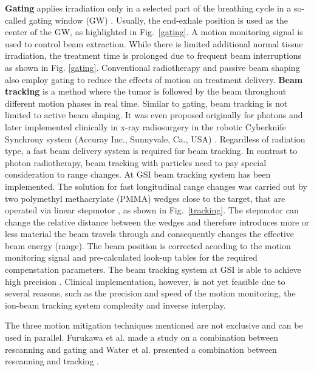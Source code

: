 \documentclass[type=dr, dr=rernat, accentcolor=tud7b,colorbacktitle, bigchapter, openright, twoside, 12pt ]{tudthesis}
\begin{document}
\textbf{Gating} applies irradiation only in a selected part of the breathing cycle in a so-called gating window (GW) \cite{Minohara2000,Lu2006}. Usually, the end-exhale position is used as the center of the GW, as highlighted in Fig.~\ref{gating}.
A motion monitoring signal is used to control beam extraction. While there is limited additional normal tissue irradiation, the treatment time is prolonged due to frequent beam interruptions as shown in Fig. \ref{gating}.
Conventional radiotherapy and passive beam shaping also employ gating to reduce the effects of motion on treatment delivery.
\newline
\textbf{Beam tracking} is a method where the tumor is followed by the beam throughout different motion phases in real time. Similar to gating, beam tracking is not limited to active beam shaping. It was even proposed originally 
for photons \cite{Keall2001} and later implemented clinically in x-ray radiosurgery in the robotic Cyberknife Synchrony system (Accuray Inc., Sunnyvale, Ca., USA) \cite{Brown2007a,Kilby2010}. Regardless of radiation type, a
fast beam delivery system is required for beam tracking. In contrast to photon radiotherapy, beam tracking with particles need to pay special consideration to range changes. At GSI beam tracking system has been implemented.
The solution for fast longitudinal range changes was carried out by two polymethyl methacrylate (PMMA) wedges close to the target, that are operated via linear stepmotor \cite{Saito2009}, as shown in Fig.~\ref{tracking}. The stepmotor can
change the relative distance between the wedges and therefore introduces more or less material the beam travels through and consequently changes the effective beam energy (range). The beam position is corrected acording to the motion monitoring
signal and pre-calculated look-up tables for the required compenstation parameters. The beam tracking system at GSI is able to achieve high precision \cite{Bert2007, Bert2009, Saito2009}.
Clinical implementation, however, is not yet feasible due to several reasons, such as the precision and speed of the motion monitoring, the ion-beam tracking system complexity and inverse interplay.


The three motion mitigation techniques mentioned are not exclusive and can be used in parallel. Furukawa et al. made a study on a combination between rescanning and gating \cite{Furukawa2007} and Water et al. presented a combination
between rescanning and tracking \cite{Water2009}.
\end{document}
